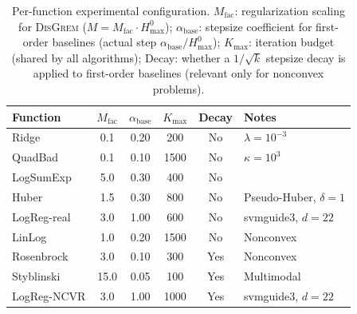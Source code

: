 \documentclass[review,onefignum,onetabnum]{siamart171218}
\begin{document}
	\begin{table}[htbp]
		\centering
		\caption{Per-function experimental configuration.
			$M_{\mathrm{fac}}$: regularization scaling for \textsc{DisGrem}
			($M = M_{\mathrm{fac}}\cdot H_{\max}^{0}$);
			$\alpha_{\mathrm{base}}$: stepsize coefficient for first-order
			baselines (actual step $\alpha_{\mathrm{base}}/H_{\max}^{0}$);
			$K_{\max}$: iteration budget (shared by all algorithms);
			Decay: whether a $1/\sqrt{k}$ stepsize decay is applied to
			first-order baselines (relevant only for nonconvex problems).}
		\label{tab:config}
		\setlength{\tabcolsep}{5pt}
		\small
		\begin{tabular}{lccccl}
			\toprule
			Function & $M_{\mathrm{fac}}$ & $\alpha_{\mathrm{base}}$ & $K_{\max}$ & Decay & Notes \\
			\midrule
			Ridge       & 0.1  & 0.20 &  200 & No  & $\lambda{=}10^{-3}$ \\
			QuadBad     & 0.1  & 0.10 & 1500 & No  & $\kappa{=}10^3$ \\
			LogSumExp   & 5.0  & 0.30 &  400 & No  & \\
			Huber       & 1.5  & 0.30 &  800 & No  & Pseudo-Huber, $\delta{=}1$ \\
			LogReg-real & 3.0  & 1.00 &  600 & No  & svmguide3, $d{=}22$ \\
			LinLog      & 1.0  & 0.20 & 1500 & No  & Nonconvex \\
			Rosenbrock  & 3.0  & 0.10 &  300 & Yes & Nonconvex \\
			Styblinski  & 15.0 & 0.05 &  100 & Yes & Multimodal \\
			LogReg-NCVR & 3.0  & 1.00 & 1000 & Yes & svmguide3, $d{=}22$ \\
			\bottomrule
		\end{tabular}
	\end{table}
	
\end{document}
